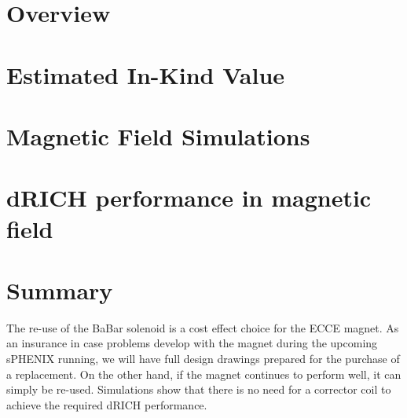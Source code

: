 \documentclass[12pt,twoside]{article}
\begin{document}
\linenumbers
\pagestyle{empty}



\pagestyle{plain}




\tableofcontents
\clearpage


\renewcommand{\thepage}{\arabic{page}}


\clearpage

\section {Overview}
\label{overview}
 

\section {Estimated In-Kind Value}
\label{costing}


\section {Magnetic Field Simulations}
\label{simulations}


\section {dRICH performance in magnetic field}
\label{dRICH}


\listoftodos[To Do]

\section{Summary}
\label{summary}
The re-use of the BaBar solenoid is a cost effect choice for the ECCE magnet.   As an insurance in case problems develop with the magnet during the upcoming sPHENIX running, we will have full design drawings prepared for the purchase of a replacement.   On the other hand, if the magnet continues to perform well, it can simply be re-used. Simulations show that there is no need for a corrector coil to achieve the required dRICH performance.  




\end{document}
